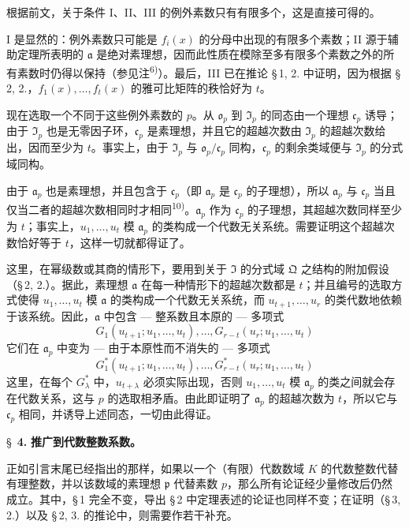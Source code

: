 \documentclass[11pt]{article}
\begin{document}
根据前文，关于条件 I、II、III 的例外素数只有有限多个，这是直接可得的。

I 是显然的：例外素数只可能是 $f_i(x)$ 的分母中出现的有限多个素数；II 源于辅助定理所表明的 $\mathfrak{a}$ 是绝对素理想，因而此性质在模除至多有限多个素数之外的所有素数时仍得以保持（参见注\textsuperscript{6)}）。最后，III 已在推论 \S\,1, 2. 中证明，因为根据 \S\,2, 2.，$f_1(x),\ldots,f_t(x)$ 的雅可比矩阵的秩恰好为 $t$。

现在选取一个不同于这些例外素数的 $p$。从 $\mathfrak{o}_p$ 到 $\mathfrak{I}_p$ 的同态由一个理想 $\mathfrak{c}_p$ 诱导；由于 $\mathfrak{I}_p$ 也是无零因子环，$\mathfrak{c}_p$ 是素理想，并且它的超越次数由 $\mathfrak{I}_p$ 的超越次数给出，因而至少为 $t$。事实上，由于 $\mathfrak{I}_p$ 与 $\mathfrak{o}_p/\mathfrak{c}_p$ 同构，$\mathfrak{c}_p$ 的剩余类域便与 $\mathfrak{I}_p$ 的分式域同构。

由于 $\mathfrak{a}_p$ 也是素理想，并且包含于 $\mathfrak{c}_p$（即 $\mathfrak{a}_p$ 是 $\mathfrak{c}_p$ 的子理想），所以 $\mathfrak{a}_p$ 与 $\mathfrak{c}_p$ 当且仅当二者的超越次数相同时才相同\textsuperscript{10)}。$\mathfrak{a}_p$ 作为 $\mathfrak{c}_p$ 的子理想，其超越次数同样至少为 $t$；事实上，$u_1,\ldots,u_t$ 模 $\mathfrak{a}_p$ 的类构成一个代数无关系统。需要证明这个超越次数恰好等于 $t$，这样一切就都得证了。

这里，在幂级数或其商的情形下，要用到关于 $\mathfrak{I}$ 的分式域 $\mathfrak{Q}$ 之结构的附加假设（\S\,2, 2.）。据此，素理想 $\mathfrak{a}$ 在每一种情形下的超越次数都是 $t$；并且编号的选取方式使得 $u_1,\ldots,u_t$ 模 $\mathfrak{a}$ 的类构成一个代数无关系统，而 $u_{t+1},\ldots,u_r$ 的类代数地依赖于该系统。因此，$\mathfrak{a}$ 中包含 --- 整系数且本原的 --- 多项式
\[
G_1(u_{t+1};u_1,\ldots,u_t),\ldots,G_{r-t}(u_r;u_1,\ldots,u_t)\tag{1}
\]
它们在 $\mathfrak{a}_p$ 中变为 --- 由于本原性而不消失的 --- 多项式
\[
G^*_1(u_{t+1};u_1,\ldots,u_t),\ldots,G^*_{r-t}(u_r;u_1,\ldots,u_t)\tag{2}
\]
这里，在每个 $G^*_\lambda$ 中，$u_{t+\lambda}$ 必须实际出现，否则 $u_1,\ldots,u_t$ 模 $\mathfrak{a}_p$ 的类之间就会存在代数关系，这与 $p$ 的选取相矛盾。由此即证明了 $\mathfrak{a}_p$ 的超越次数为 $t$，所以它与 $\mathfrak{c}_p$ 相同，并诱导上述同态，一切由此得证。

\bigskip
\S~\textbf{4.}
\textbf{推广到代数整数系数。}

\smallskip

\noindent
正如引言末尾已经指出的那样，如果以一个（有限）代数数域 $K$ 的代数整数代替有理整数，并以该数域的素理想 $\mathfrak{p}$ 代替素数 $p$，那么所有论证经少量修改后仍然成立。其中，\S\,1 完全不变，导出 \S\,2 中定理表述的论证也同样不变；在证明（\S\,3, 2.）以及 \S\,2, 3. 的推论中，则需要作若干补充。
\end{document}
